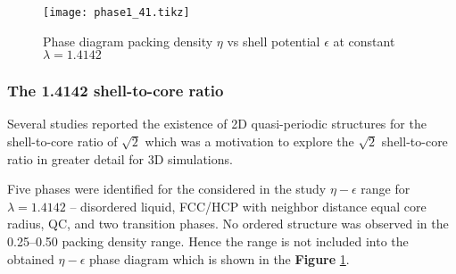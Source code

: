 

\begin{figure}[H]
\centering
\texttt{[image: phase1\_41.tikz]}
\caption{Phase diagram packing density $\eta$ vs shell potential $\epsilon$ at constant $\lambda=1.4142$} \label{fig:phase_1_41}
\end{figure}

\subsubsection{The 1.4142 shell-to-core ratio}

Several studies\cite{dotera2014mosaic,stability} reported the existence of 2D quasi-periodic structures for the shell-to-core ratio of $\sqrt{2}$ %
which was a motivation to explore the $\sqrt{2}$ shell-to-core ratio in greater detail for 3D simulations.

Five phases were identified for the considered in the study $\eta-\epsilon$ range for $\lambda=1.4142$ -- disordered liquid, FCC/HCP with neighbor distance equal core radius,  QC, and two transition phases. No ordered structure was observed in the 0.25--0.50 packing density range. Hence the range is not included into the obtained $\eta-\epsilon$ phase diagram which is shown in the \textbf{Figure}  \ref{fig:phase_1_41}. %

